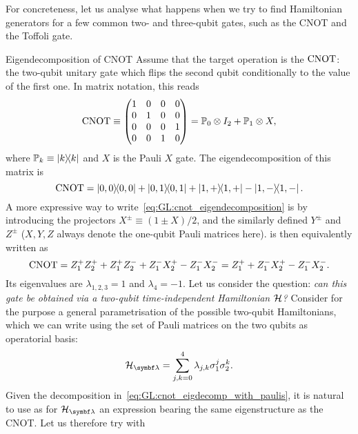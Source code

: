 For concreteness, let us analyse what happens when we try to find Hamiltonian generators for a few common two- and three-qubit gates, such as the CNOT and the Toffoli gate.

\begin{examplebox}[label={ex:GL:eigendecomposition_cnot}]{Eigendecomposition of CNOT}
Assume that the target operation is the $\operatorname{CNOT}$: the two-qubit unitary gate which flips the second qubit conditionally to the value of the first one.
In matrix notation, this reads
\begin{equation}
    \operatorname{CNOT} \equiv\begin{pmatrix}1&0&0&0 \\ 0&1&0&0 \\ 0&0&0&1\\0&0&1&0\end{pmatrix} =
    {\mathbb{P}}_0\otimes I_2 + {\mathbb{P}}_1\otimes X,
\end{equation}
where ${\mathbb{P}}_k\equiv\ketbra k$ and $X$ is the Pauli $X$ gate.
The eigendecomposition of this matrix is
\begin{equation}
    \operatorname{CNOT} =
    \ketbra{0,0} + \ketbra{0,1} + \ketbra{1,+} - \ketbra{1,-}.
    \label{eq:GL:cnot_eigendecomposition}
\end{equation}
A more expressive way to write~\cref{eq:GL:cnot_eigendecomposition} is by introducing the projectors $X^\pm\equiv(1\pm X)/2$, and the similarly defined $Y^\pm$ and $Z^\pm$ ($X,Y,Z$ always denote the one-qubit Pauli matrices here).
 is then equivalently written as
\begin{equation}
    \operatorname{CNOT} =
    Z^+_1 Z^+_2 + Z^+_1 Z^-_2
    + Z^-_1 X^+_2
    - Z^-_1 X^-_2
    = Z_1^+ + Z_1^- X_2^+ - Z_1^- X_2^-.
    \label{eq:GL:cnot_eigdecomp_with_paulis}
\end{equation}
Its eigenvalues are $\lambda_{1,2,3}=1$ and $\lambda_4=-1$.
Let us consider the question: \emph{can this gate be obtained via a two-qubit time-independent Hamiltonian ${\mathcal{H}}$?}
Consider for the purpose a general parametrisation of the possible two-qubit Hamiltonians, which we can write using the set of Pauli matrices on the two qubits as operatorial basis:
\begin{equation}
    \calH_\bslambda =
    \sum_{j,k=0}^4 \lambda_{j,k} \sigma^j_1\sigma^k_2.
\end{equation}
Given the decomposition in~\cref{eq:GL:cnot_eigdecomp_with_paulis}, it is natural to use as \ansatz for $\calH_\bslambda$ an expression bearing the same eigenstructure as the CNOT. Let us therefore try with

\end{examplebox}
